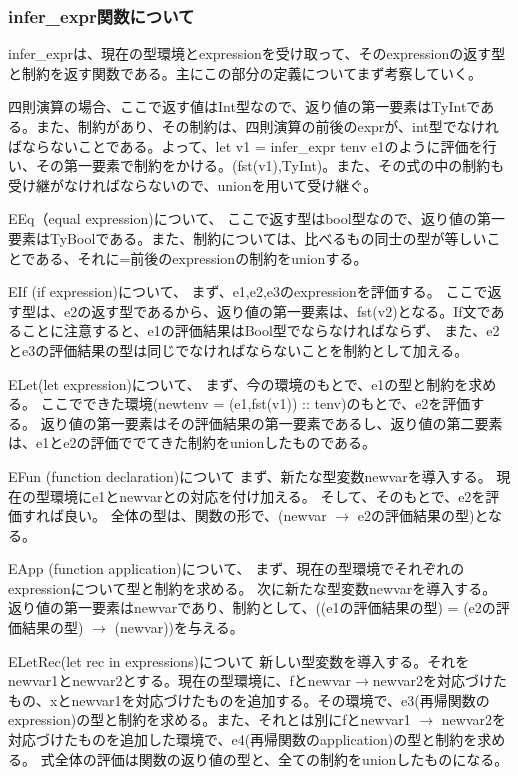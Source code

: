 \documentclass[uplatex,12pt]{jsarticle}
\begin{document}
\subsubsection{infer\_expr関数について}

infer\_exprは、現在の型環境とexpressionを受け取って、そのexpressionの返す型と制約を返す関数である。主にこの部分の定義についてまず考察していく。

四則演算の場合、ここで返す値はInt型なので、返り値の第一要素はTyIntである。また、制約があり、その制約は、四則演算の前後のexprが、int型でなければならないことである。よって、let v1 = infer\_expr tenv e1のように評価を行い、その第一要素で制約をかける。(fst(v1),TyInt)。また、その式の中の制約も受け継がなければならないので、unionを用いて受け継ぐ。

EEq（equal expression)について、
ここで返す型はbool型なので、返り値の第一要素はTyBoolである。また、制約については、比べるもの同士の型が等しいことである、それに=前後のexpressionの制約をunionする。

EIf (if expression)について、
まず、e1,e2,e3のexpressionを評価する。
ここで返す型は、e2の返す型であるから、返り値の第一要素は、fst(v2)となる。If文であることに注意すると、e1の評価結果はBool型でならなければならず、
また、e2とe3の評価結果の型は同じでなければならないことを制約として加える。

ELet(let expression)について、
まず、今の環境のもとで、e1の型と制約を求める。
ここでできた環境(newtenv = (e1,fst(v1)) :: tenv)のもとで、e2を評価する。
返り値の第一要素はその評価結果の第一要素であるし、返り値の第二要素は、e1とe2の評価ででてきた制約をunionしたものである。

EFun (function declaration)について
まず、新たな型変数newvarを導入する。
現在の型環境にe1とnewvarとの対応を付け加える。
そして、そのもとで、e2を評価すれば良い。
全体の型は、関数の形で、(newvar $\rightarrow$ e2の評価結果の型)となる。

EApp (function application)について、
まず、現在の型環境でそれぞれのexpressionについて型と制約を求める。
次に新たな型変数newvarを導入する。
返り値の第一要素はnewvarであり、制約として、((e1の評価結果の型) = (e2の評価結果の型) $\rightarrow$ (newvar))を与える。

ELetRec(let rec in expressions)について
新しい型変数を導入する。それをnewvar1とnewvar2とする。現在の型環境に、fとnewvar$\rightarrow$newvar2を対応づけたもの、xとnewvar1を対応づけたものを追加する。その環境で、e3(再帰関数のexpression)の型と制約を求める。また、それとは別にfとnewvar1 $\rightarrow$ newvar2を対応づけたものを追加した環境で、e4(再帰関数のapplication)の型と制約を求める。
式全体の評価は関数の返り値の型と、全ての制約をunionしたものになる。
\end{document}
